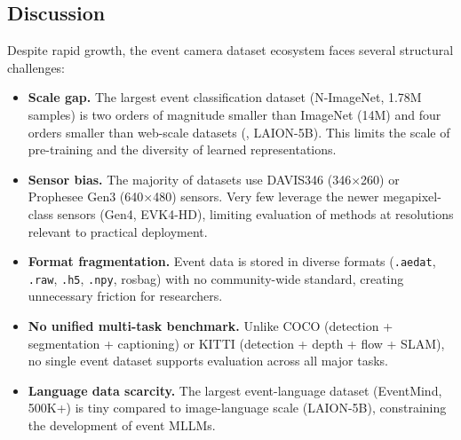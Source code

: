 \subsection{Discussion}
\label{sec:data_discussion}

Despite rapid growth, the event camera dataset ecosystem faces several structural challenges:

\begin{itemize}[leftmargin=*]
    \item \textbf{Scale gap.} The largest event classification dataset (N-ImageNet, 1.78M samples) is two orders of magnitude smaller than ImageNet (14M) and four orders smaller than web-scale datasets (\eg, LAION-5B). This limits the scale of pre-training and the diversity of learned representations.

    \item \textbf{Sensor bias.} The majority of datasets use DAVIS346 (346$\times$260) or Prophesee Gen3 (640$\times$480) sensors. Very few leverage the newer megapixel-class sensors (Gen4, EVK4-HD), limiting evaluation of methods at resolutions relevant to practical deployment.

    \item \textbf{Format fragmentation.} Event data is stored in diverse formats (\texttt{.aedat}, \texttt{.raw}, \texttt{.h5}, \texttt{.npy}, rosbag) with no community-wide standard, creating unnecessary friction for researchers.

    \item \textbf{No unified multi-task benchmark.} Unlike COCO (detection + segmentation + captioning) or KITTI (detection + depth + flow + SLAM), no single event dataset supports evaluation across all major tasks.

    \item \textbf{Language data scarcity.} The largest event-language dataset (EventMind, 500K+) is tiny compared to image-language scale (LAION-5B), constraining the development of event MLLMs.
\end{itemize}
